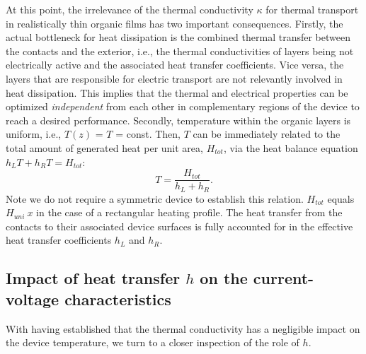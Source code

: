 \documentclass[%
9pt,
 aip,
rsi,%
 amsmath,amssymb,
preprint,%
]{revtex4-1}
\begin{document}
At this point, the irrelevance of the thermal conductivity $\kappa$ for thermal transport in realistically thin organic films has two important consequences.
Firstly, the actual bottleneck for heat dissipation is the combined thermal transfer between the contacts and the exterior, i.e., the thermal conductivities of layers being not electrically active and the associated heat transfer coefficients.
Vice versa, the layers that are responsible for electric transport are not relevantly involved in heat dissipation. 
This implies that the thermal and electrical properties can be optimized \textit{independent} from each other in complementary regions of the device to reach a desired performance. 
Secondly, temperature within the organic layers is uniform, i.e., $T(z)$ = $T$ = const.
Then, $T$ can be immediately related to the total amount of generated heat per unit area, $H_{tot}$, via the heat balance equation $h_L T + h_R T = H_{tot}$:
%
\begin{equation}
	T=\frac{H_{tot}}{h_L+h_R}.
    \label{eq:onlyh}
\end{equation}
%
Note we do not require a symmetric device to establish this relation. 
$H_{tot}$ equals $H_{uni}~x$ in the case of a rectangular heating profile.
The heat transfer from the contacts to their associated device surfaces is fully accounted for in the effective heat transfer coefficients $h_L$ and $h_R$.  









\subsection{Impact of heat transfer $h$ on the current-voltage characteristics}
With having established that the thermal conductivity has a negligible impact on the device temperature, we turn to a closer inspection of the role of $h$.
\end{document}
